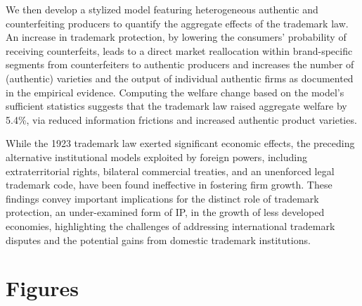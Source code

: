 \documentclass[12pt]{article}
\begin{document}
We then develop a stylized model featuring heterogeneous authentic and counterfeiting producers to quantify the aggregate effects of the trademark law. An increase in trademark protection, by lowering the consumers' probability of receiving counterfeits, leads to a direct market reallocation within brand-specific segments from counterfeiters to authentic producers and increases the number of (authentic) varieties and the output of individual authentic firms as documented in the empirical evidence. Computing the welfare change based on the model's sufficient statistics suggests that the trademark law raised aggregate welfare by 5.4\%, via reduced information frictions and increased authentic product varieties.

While the 1923 trademark law exerted significant economic effects, the preceding alternative institutional models exploited by foreign powers, including extraterritorial rights, bilateral commercial treaties, and an unenforced legal trademark code, have been found ineffective in fostering firm growth. These findings convey important implications for the distinct role of trademark protection, an under-examined form of IP, in the growth of less developed economies, highlighting the challenges of addressing international trademark disputes and the potential gains from domestic trademark institutions.



\clearpage
\appendix
\singlespacing
\setlength{\bibsep}{0.0pt}






\clearpage
\section{Figures}


\end{document}
